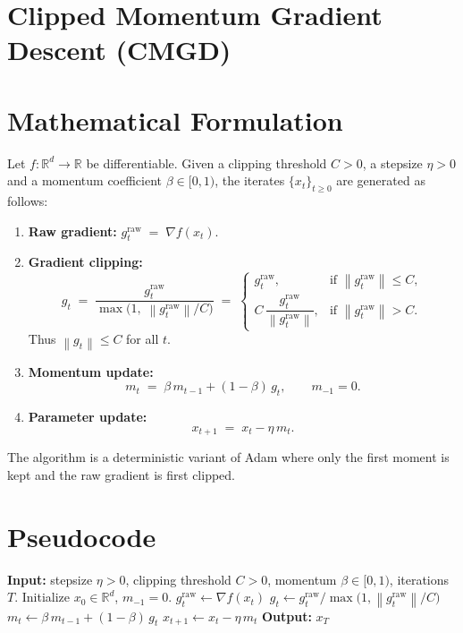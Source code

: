\documentclass{article}
\newcommand{\norm}[1]{\left\lVert #1\right\rVert}
\newcommand{\grad}{\nabla}
\begin{document}
\section*{Clipped Momentum Gradient Descent (CMGD)}

\section*{Mathematical Formulation}
Let $f:\mathbb{R}^d\rightarrow\mathbb{R}$ be differentiable.  
Given a clipping threshold $C>0$, a stepsize $\eta>0$ and a momentum coefficient $\beta\in[0,1)$, the iterates $\{x_t\}_{t\ge 0}$ are generated as follows:

\begin{enumerate}[label=\arabic*)]
\item \textbf{Raw gradient:} $g^{\text{raw}}_t \;=\; \grad f(x_t)$.
\item \textbf{Gradient clipping:}
\[
g_t \;=\; \frac{g^{\text{raw}}_t}{\max\!\bigl(1,\; \norm{g^{\text{raw}}_t}/C\bigr)}
\;=\;
\begin{cases}
g^{\text{raw}}_t, &\text{if }\norm{g^{\text{raw}}_t}\le C,\\[4pt]
C\,\dfrac{g^{\text{raw}}_t}{\norm{g^{\text{raw}}_t}}, &\text{if }\norm{g^{\text{raw}}_t}> C .
\end{cases}
\]
Thus $\norm{g_t}\le C$ for all $t$.
\item \textbf{Momentum update:}
\[
m_t \;=\; \beta\, m_{t-1} + (1-\beta)\, g_t,\qquad m_{-1}=0 .
\]
\item \textbf{Parameter update:}
\[
x_{t+1} \;=\; x_t - \eta\, m_t .
\]
\end{enumerate}

The algorithm is a deterministic variant of Adam where only the first moment is kept and the raw gradient is first clipped.

\section*{Pseudocode}
\begin{algorithm}[H]
\caption{Clipped Momentum Gradient Descent (CMGD)}
\begin{algorithmic}[1]
\State \textbf{Input:} stepsize $\eta>0$, clipping threshold $C>0$, momentum $\beta\in[0,1)$, iterations $T$.
\State Initialize $x_0\in\mathbb{R}^d$, $m_{-1}=0$.
    \State $g^{\text{raw}}_t \gets \grad f(x_t)$
    \State $g_t \gets g^{\text{raw}}_t / \max\bigl(1,\norm{g^{\text{raw}}_t}/C\bigr)$ 
    \State $m_t \gets \beta\, m_{t-1} + (1-\beta)\, g_t$
    \State $x_{t+1} \gets x_t - \eta\, m_t$
\EndFor
\State \textbf{Output:} $x_T$
\end{algorithmic}
\end{algorithm}
\end{document}
